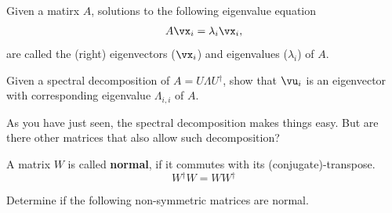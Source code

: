 \documentclass[a4paper,11pt]{exam}
\newcounter{ct}
\newcommand{\trp}{{^\top}} %
\newcommand{\ctrp}{{^\dagger}} %
\begin{document}
\begin{questions}

\clearpage
\begin{tcolorbox}[colback=black!1!,title=Eigenvalues and eigenvectors]
Given a matirx $A$, solutions to the following eigenvalue equation
\begin{align}\label{eq:eigenvalue}
	A \vx_i = \lambda_i \vx_i,
\end{align}
are called the (right) eigenvectors ($\vx_i$) and eigenvalues ($\lambda_i$) of $A$.
\end{tcolorbox}

\question Given a spectral decomposition of $A = U\Lambda U\ctrp$, show that $\vu_i$ is an eigenvector with corresponding eigenvalue $\Lambda_{i,i}$ of $A$.

As you have just seen, the spectral decomposition makes things easy.
But are there other matrices that also allow such decomposition?

\begin{tcolorbox}[colback=black!1!,title=Normal matrices]
    A matrix $W$ is called \textbf{normal}, if it commutes with its (conjugate)-transpose.
    $$W\ctrp W = W W\ctrp$$
\end{tcolorbox}
\question Determine if the following non-symmetric matrices are normal.
\begin{parts}

\end{parts}
\end{questions}
\end{document}
